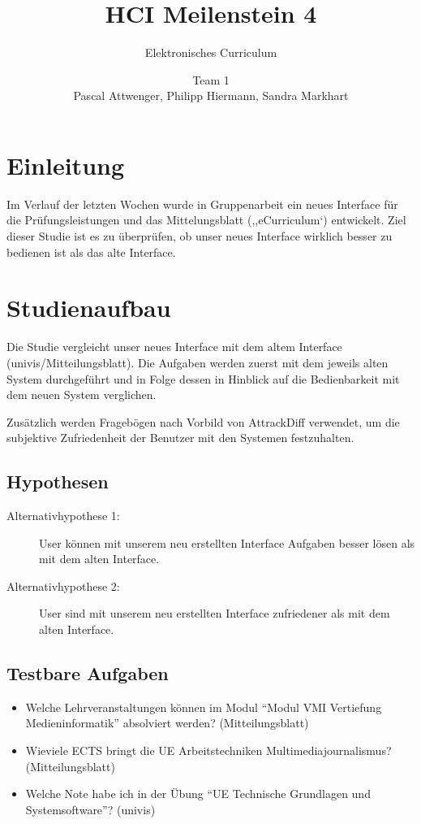 \documentclass[a4paper,10pt]{scrartcl}
\title{HCI Meilenstein 4}
\subtitle{Elektronisches Curriculum}
\author{Team 1 \\Pascal Attwenger, Philipp Hiermann, Sandra Markhart}
\begin{document}
\maketitle

\section{Einleitung}

Im Verlauf der letzten Wochen wurde in Gruppenarbeit ein neues Interface für die Prüfungsleistungen und das Mittelungsblatt (,,eCurriculum`) entwickelt.
Ziel dieser Studie ist es zu überprüfen, ob unser neues Interface wirklich besser zu bedienen ist als das alte Interface.

\section{Studienaufbau} 

Die Studie vergleicht unser neues Interface mit dem altem Interface (univis/Mitteilungsblatt). Die Aufgaben werden zuerst mit dem jeweils alten System durchgeführt und in Folge dessen in Hinblick auf die Bedienbarkeit mit dem neuen System verglichen.

Zusätzlich werden Fragebögen nach Vorbild von AttrackDiff verwendet, um die subjektive Zufriedenheit der Benutzer mit den Systemen festzuhalten.

\subsection{Hypothesen}


\begin{description}
 \item[Alternativhypothese 1: ] User können mit unserem neu erstellten Interface Aufgaben besser lösen als mit dem alten Interface. 
\end{description}

\begin{description}
 \item[Alternativhypothese 2: ] User sind mit unserem neu erstellten Interface zufriedener als mit dem alten Interface. 
\end{description}


\subsection{Testbare Aufgaben}

\begin{itemize}
 \item Welche Lehrveranstaltungen können im Modul ``Modul VMI Vertiefung Medieninformatik'' absolviert werden? (Mitteilungsblatt)
 \item Wieviele ECTS bringt die UE Arbeitstechniken Multimediajournalismus? (Mitteilungsblatt)
 \item Welche Note habe ich in der Übung ``UE Technische Grundlagen und Systemsoftware''? (univis)
\end{itemize}
\end{document}
